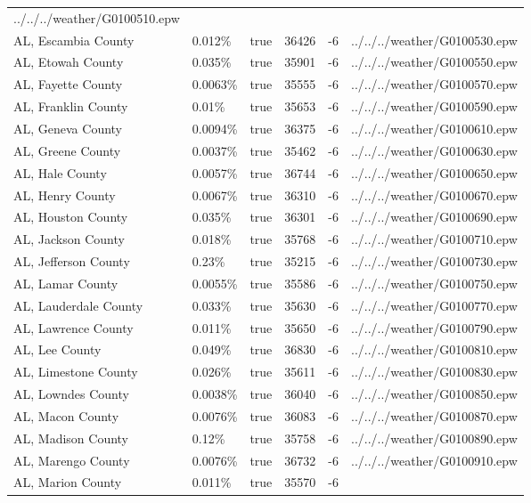 \begin{longtable}[]{@{}llllll@{}}
../../../weather/G0100510.epw \\
AL, Escambia County & 0.012\% & true & 36426 & -6 &
../../../weather/G0100530.epw \\
AL, Etowah County & 0.035\% & true & 35901 & -6 &
../../../weather/G0100550.epw \\
AL, Fayette County & 0.0063\% & true & 35555 & -6 &
../../../weather/G0100570.epw \\
AL, Franklin County & 0.01\% & true & 35653 & -6 &
../../../weather/G0100590.epw \\
AL, Geneva County & 0.0094\% & true & 36375 & -6 &
../../../weather/G0100610.epw \\
AL, Greene County & 0.0037\% & true & 35462 & -6 &
../../../weather/G0100630.epw \\
AL, Hale County & 0.0057\% & true & 36744 & -6 &
../../../weather/G0100650.epw \\
AL, Henry County & 0.0067\% & true & 36310 & -6 &
../../../weather/G0100670.epw \\
AL, Houston County & 0.035\% & true & 36301 & -6 &
../../../weather/G0100690.epw \\
AL, Jackson County & 0.018\% & true & 35768 & -6 &
../../../weather/G0100710.epw \\
AL, Jefferson County & 0.23\% & true & 35215 & -6 &
../../../weather/G0100730.epw \\
AL, Lamar County & 0.0055\% & true & 35586 & -6 &
../../../weather/G0100750.epw \\
AL, Lauderdale County & 0.033\% & true & 35630 & -6 &
../../../weather/G0100770.epw \\
AL, Lawrence County & 0.011\% & true & 35650 & -6 &
../../../weather/G0100790.epw \\
AL, Lee County & 0.049\% & true & 36830 & -6 &
../../../weather/G0100810.epw \\
AL, Limestone County & 0.026\% & true & 35611 & -6 &
../../../weather/G0100830.epw \\
AL, Lowndes County & 0.0038\% & true & 36040 & -6 &
../../../weather/G0100850.epw \\
AL, Macon County & 0.0076\% & true & 36083 & -6 &
../../../weather/G0100870.epw \\
AL, Madison County & 0.12\% & true & 35758 & -6 &
../../../weather/G0100890.epw \\
AL, Marengo County & 0.0076\% & true & 36732 & -6 &
../../../weather/G0100910.epw \\
AL, Marion County & 0.011\% & true & 35570 & -6 &

\end{longtable}

